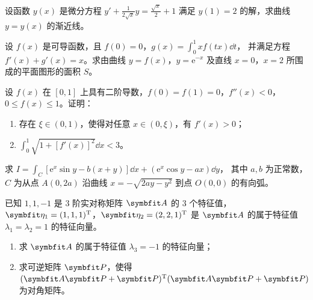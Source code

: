 \begin{question}[index=17,points=10]
设函数 $y(x)$ 是微分方程 $\displaystyle y'+\frac{1}{2\sqrt x}y=\frac{\sqrt x}{2}+1$
满足 $y(1)=2$ 的解，求曲线 $y=y(x)$ 的渐近线。
\end{question}
\QuestionBreak\WorkSpace

\begin{question}[index=18,points=12]
设 $f(x)$ 是可导函数，且 $f(0)=0$，$\displaystyle g(x)=\int_0^1 xf(tx)\dd t$，
并满足方程 $f'(x)+g'(x)=x$。求由曲线 $y=f(x)$，$y=\mathrm e^{-x}$
及直线 $x=0$，$x=2$ 所围成的平面图形的面积 $S$。
\end{question}
\QuestionBreak\WorkSpace\WorkPageBreak

\begin{question}[index=19,points=12]
设 $f(x)$ 在 $[0,1]$ 上具有二阶导数，$f(0)=f(1)=0$，$f''(x)<0$，$0\le f(x)\le1$。证明：
\begin{enumerate}[label=（\arabic*）,leftmargin=2.5em,labelsep=.4em,itemsep=3pt,topsep=3pt]
\item 存在 $\xi\in(0,1)$，使得对任意 $x\in(0,\xi)$，有 $f'(x)>0$；
\item $\displaystyle\int_0^1\sqrt{1+[f'(x)]^2}\dd x<3$。
\end{enumerate}
\end{question}
\QuestionBreak\WorkSpace

\begin{question}[index=20,points=12]
求 $\displaystyle I=\int_C[\mathrm e^x\sin y-b(x+y)]\dd x+(\mathrm e^x\cos y-ax)\dd y$，
其中 $a,b$ 为正常数，$C$ 为从点 $A(0,2a)$ 沿曲线 $x=-\sqrt{2ay-y^2}$ 到点 $O(0,0)$ 的有向弧。
\end{question}
\QuestionBreak\WorkSpace\WorkPageBreak

\begin{question}[index=21,points=12]
已知 $1,1,-1$ 是 $3$ 阶实对称矩阵 $\symbfit A$ 的 $3$ 个特征值，
$\symbfit\eta_1=(1,1,1)^{\mathrm T}$，$\symbfit\eta_2=(2,2,1)^{\mathrm T}$
是 $\symbfit A$ 的属于特征值 $\lambda_1=\lambda_2=1$ 的特征向量。
\begin{enumerate}[label=（\arabic*）,leftmargin=2.5em,labelsep=.4em,itemsep=3pt,topsep=3pt]
\item 求 $\symbfit A$ 的属于特征值 $\lambda_3=-1$ 的特征向量；
\item 求可逆矩阵 $\symbfit P$，使得
$(\symbfit A\symbfit P+\symbfit P)^{\mathrm T}(\symbfit A\symbfit P+\symbfit P)$ 为对角矩阵。
\end{enumerate}
\end{question}
\QuestionBreak\WorkSpace

